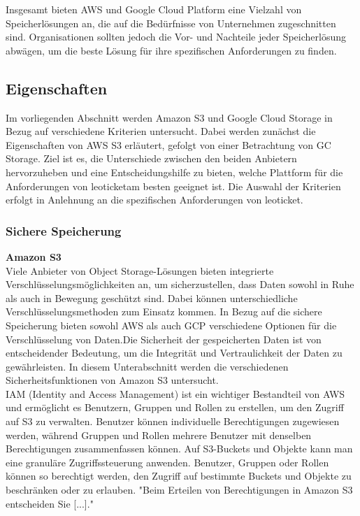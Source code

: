Insgesamt bieten AWS und Google Cloud Platform eine Vielzahl von Speicherlösungen an, die auf die Bedürfnisse von Unternehmen zugeschnitten sind. Organisationen sollten jedoch die Vor- und Nachteile jeder Speicherlösung abwägen, um die beste Lösung für ihre spezifischen Anforderungen zu finden.

\newpage

\subsection{Eigenschaften}

Im vorliegenden Abschnitt werden Amazon S3 und Google Cloud Storage in Bezug auf verschiedene Kriterien untersucht. Dabei werden zunächst die Eigenschaften von AWS S3 erläutert, gefolgt von einer Betrachtung von GC Storage. Ziel ist es, die Unterschiede zwischen den beiden Anbietern hervorzuheben und eine Entscheidungshilfe zu bieten, welche Plattform für die Anforderungen von \glqq leoticket\grqq am besten geeignet ist. Die Auswahl der Kriterien erfolgt in Anlehnung an die spezifischen Anforderungen von \glqq leoticket\grqq.


\subsubsection{Sichere Speicherung}

\textbf{Amazon S3}\\

Viele Anbieter von Object Storage-Lösungen bieten integrierte Verschlüsselungsmöglichkeiten an, um sicherzustellen, dass Daten sowohl in Ruhe als auch in Bewegung geschützt sind. Dabei können unterschiedliche Verschlüsselungsmethoden zum Einsatz kommen. In Bezug auf die sichere Speicherung bieten sowohl AWS als auch GCP verschiedene Optionen für die Verschlüsselung von Daten.Die Sicherheit der gespeicherten Daten ist von entscheidender Bedeutung, um die Integrität und Vertraulichkeit der Daten zu gewährleisten. In diesem Unterabschnitt werden die verschiedenen Sicherheitsfunktionen von Amazon S3 untersucht.\\

IAM (Identity and Access Management) ist ein wichtiger Bestandteil von AWS und ermöglicht es Benutzern, Gruppen und Rollen zu erstellen, um den Zugriff auf S3 zu verwalten. Benutzer können individuelle Berechtigungen zugewiesen werden, während Gruppen und Rollen mehrere Benutzer mit denselben Berechtigungen zusammenfassen können. Auf S3-Buckets und Objekte kann man eine granuläre Zugriffssteuerung anwenden. Benutzer, Gruppen oder Rollen können so berechtigt werden, den Zugriff auf bestimmte Buckets und Objekte zu beschränken oder zu erlauben. "Beim Erteilen von Berechtigungen in Amazon S3 entscheiden Sie [...]."\cite{aws-iam-s3}\\

